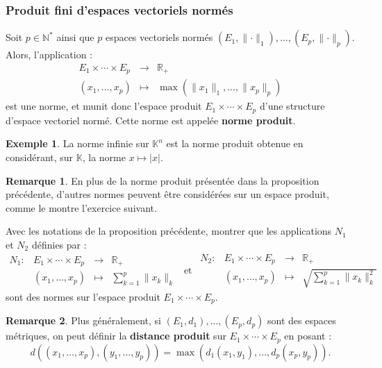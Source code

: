 \documentclass[french]{article}
\newcommand{\N}{\mathbb{N}}
\newcommand{\R}{\mathbb{R}}
\newcommand{\K}{\mathbb{K}}
\newcommand{\st}{^*}
\theoremstyle{plain}
\theoremstyle{definition}
\newtheorem*{ex}{Exemple}
\newtheorem*{rmq}{Remarque}
\theoremstyle{remark}
\begin{document}
\subsubsection*{Produit fini d'espaces vectoriels normés}

\begin{prop}%
	Soit $p\in\N\st$ ainsi que $p$ espaces vectoriels normés $(E_1,\lVert\cdot\rVert_1),\ldots,(E_p,\lVert\cdot\rVert_p)$. Alors, l'application : $$\begin{array}{rcl}
		E_1\times\cdots\times E_p&\longrightarrow&\R_+\\
		(x_1,\ldots,x_p)&\longmapsto&\max(\lVert x_1\rVert_1,\ldots,\lVert x_p\rVert_p)
	\end{array}$$ est une norme, et munit donc l'espace produit $E_1\times\cdots\times E_p$ d'une structure d'espace vectoriel normé. Cette norme est appelée \textbf{norme produit}.
\end{prop}

\begin{ex}
	La norme infinie sur $\K^n$ est la norme produit obtenue en considérant, sur $\K$, la norme $x\mapsto\lvert x\rvert$.
\end{ex}

\begin{rmq}
	En plus de la norme produit présentée dans la proposition précédente, d'autres normes peuvent être considérées sur un espace produit, comme le montre l'exercice suivant.
\end{rmq}

\begin{exo}
	Avec les notations de la proposition précédente, montrer que les applications $N_1$ et $N_2$ définies par : 
	$$\begin{array}{lrcl}
		N_1:&E_1\times\cdots\times E_p&\longrightarrow&\R_+\\
		&(x_1,\ldots,x_p)&\longmapsto&\displaystyle\sum_{k=1}^{p}\lVert x_k\rVert_k
	\end{array}\ \ \text{et}\ \
	\begin{array}{lrcl}
		N_2:&E_1\times\cdots\times E_p&\longrightarrow&\R_+\\
		&(x_1,\ldots,x_p)&\longmapsto&\displaystyle\sqrt{\sum_{k=1}^{p}\lVert x_k\rVert_k^2}
	\end{array}$$ sont des normes sur l'espace produit $E_1\times\cdots\times E_p$.
\end{exo}

\begin{rmq}
	Plus généralement, si $(E_1,d_1),\ldots,(E_p,d_p)$ sont des espaces métriques, on peut définir la \textbf{distance produit} sur $E_1\times\cdots\times E_p$ en posant : $$d((x_1,\ldots,x_p),(y_1,\ldots,y_p))=\max(d_1(x_1,y_1),\ldots,d_p(x_p,y_p)).$$
\end{rmq}
\end{document}
